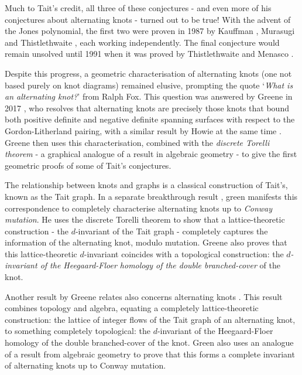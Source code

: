\documentclass[12pt]{report}
\theoremstyle{upright}
\begin{document}
Much to Tait's credit, all three of these conjectures - and even more of his conjectures about alternating knots - turned out to be true! With the advent of the Jones polynomial, the first two were proven in 1987 by Kauffman \cite{state-models-jones-polynomial}, Murasugi \cite{jones-polynomials-classical-conjectures} and Thistlethwaite \cite{spanning-tree-expansion-jones-polynomial}, each working independently. The final conjecture would remain unsolved until 1991 when it was proved by Thistlethwaite and Menasco \cite{classification-alternating-links}.

Despite this progress, a geometric characterisation of alternating knots (one not based purely on knot diagrams) remained elusive, prompting the quote `\textit{What is an alternating knot?}' from Ralph Fox. This question was answered by Greene in 2017 \cite{alternating-links-definite-surfaces}, who resolves that alternating knots are precisely those knots that bound both positive definite and negative definite spanning surfaces with respect to the Gordon-Litherland pairing, with a similar result by Howie at the same time \cite{characterisation-alternating-knot-exteriors}. Greene then uses this characterisation, combined with the \textit{discrete Torelli theorem} - a graphical analogue of a result in algebraic geometry - to give the first geometric proofs of some of Tait's conjectures.

The relationship between knots and graphs is a classical construction of Tait's, known as the Tait graph. In a separate breakthrough result \cite{lattices-graphs-mutation}, green manifests this correspondence to completely characterise alternating knots up to \textit{Conway mutation}. He uses the discrete Torelli theorem to show that a lattice-theoretic construction - the $d$-invariant of the Tait graph - completely captures the information of the alternating knot, modulo mutation. Greene also proves that this lattice-theoretic $d$-invariant coincides with a topological construction: the \textit{$d$-invariant of the Heegaard-Floer homology of the double branched-cover} of the knot.

Another result by Greene relates also concerns alternating knots \cite{lattices-graphs-mutation}. This result combines topology and algebra, equating a completely lattice-theoretic construction: the lattice of integer flows of the Tait graph of an alternating knot, to something completely topological: the $d$-invariant of the Heegaard-Floer homology of the double branched-cover of the knot. Green also uses an analogue of a result from algebraic geometry to prove that this forms a complete invariant of alternating knots up to Conway mutation.
\end{document}
